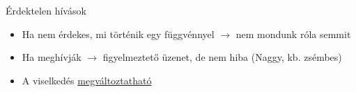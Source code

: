 \documentclass[usenames,dvipsnames,aspectratio=169]{beamer}
\newcommand{\hiv}[1]{{\color{hivatkozasszin}#1}}
\begin{document}
\begin{frame}
    Érdektelen hívások
    \begin{itemize}
        \item Ha nem érdekes, mi történik egy függvénnyel $\to$ nem mondunk róla semmit
        \item Ha meghívják $\to$ figyelmeztető üzenet, de nem hiba (Naggy, kb. zsémbes)
        \item A viselkedés \hiv{\href{https://google.github.io/googletest/gmock\_cook\_book.html\#NiceStrictNaggy}{megváltoztatható}}
    \end{itemize}
\end{frame}
\end{document}
